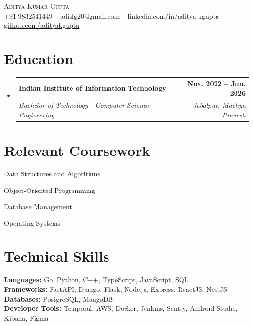 \documentclass[a4paper,11pt]{article}
\makeatletter
\newcommand{\resumeSubheading}[4]{
  \vspace{-2pt}\item
    \begin{tabular*}{1.0\textwidth}[t]{l@{\extracolsep{\fill}}r}
      \textbf{#1} & \textbf{\small #2} \\
      \textit{\small#3} & \textit{\small #4} \\
    \end{tabular*}\vspace{-7pt}
}
\newcommand{\resumeSubHeadingListStart}{\begin{itemize}[leftmargin=0.0in, label={}]}
\newcommand{\resumeSubHeadingListEnd}{\end{itemize}}
\makeatother
\begin{document}
    \begin{center}
        {\Huge \scshape Aditya Kumar Gupta} \\ \vspace{5pt}
        \small
        \href{tel:+919832541449}{\underline{+91 9832541449}} ~
        \href{mailto:adislg20@gmail.com}{\underline{adislg20@gmail.com}} ~
        \href{https://linkedin.com/in/aditya-kgupta/}{\underline{linkedin.com/in/aditya-kgupta}}  ~
        \href{https://github.com/adityakgupta}{\underline{github.com/adityakgupta}}
        \vspace{-8pt}
    \end{center}

    \section{Education}
        \resumeSubHeadingListStart
            \resumeSubheading
            {Indian Institute of Information Technology}{Nov. 2022 -- Jun. 2026}
            {Bachelor of Technology - Computer Science Engineering}{Jabalpur, Madhya Pradesh}
        \resumeSubHeadingListEnd

    \section{Relevant Coursework}
        \begin{center}
            \begin{itemize*}[itemjoin={\hfill}, afterlabel={\hspace{0.1cm}}]
                \item\small Data Structures and Algorithms
                \item Object-Oriented Programming
                \item Database Management
                \item Operating Systems
            \end{itemize*}
            \vspace{-5pt}
        \end{center}

    \section{Technical Skills}
        \textbf{Languages: }{Go, Python, C++, TypeScript, JavaScript, SQL} \\
        \textbf{Frameworks: }{FastAPI, Django, Flask, Node.js, Express, ReactJS, NestJS} \\
        \textbf{Databases: }{PostgreSQL, MongoDB} \\
        \textbf{Developer Tools: }{Temporal, AWS, Docker, Jenkins, Sentry, Android Studio, Kibana, Figma} \\
        \vspace{-8pt}
\end{document}
